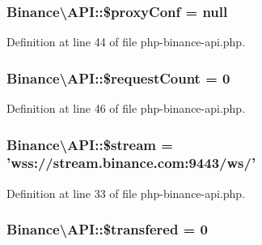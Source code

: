 \hypertarget{classBinance_1_1API_a1415587257942c2b5af22c642ff58005}{
\subsubsection[{\$proxy\-Conf}]{\setlength{\rightskip}{0pt plus 5cm}Binance\textbackslash{}\-A\-P\-I\-::\$proxy\-Conf = null\hspace{0.3cm}{\ttfamily [protected]}}}\label{classBinance_1_1API_a1415587257942c2b5af22c642ff58005}


Definition at line 44 of file php-\/binance-\/api.\-php.

\hypertarget{classBinance_1_1API_a69a4bfc5a6773dff1d01166dfbb402a2}{
\subsubsection[{\$request\-Count}]{\setlength{\rightskip}{0pt plus 5cm}Binance\textbackslash{}\-A\-P\-I\-::\$request\-Count = 0\hspace{0.3cm}{\ttfamily [protected]}}}\label{classBinance_1_1API_a69a4bfc5a6773dff1d01166dfbb402a2}


Definition at line 46 of file php-\/binance-\/api.\-php.

\hypertarget{classBinance_1_1API_a0ce2df2282110071b78061c3043200af}{
\subsubsection[{\$stream}]{\setlength{\rightskip}{0pt plus 5cm}Binance\textbackslash{}\-A\-P\-I\-::\$stream = 'wss\-://stream.\-binance.\-com\-:9443/ws/'\hspace{0.3cm}{\ttfamily [protected]}}}\label{classBinance_1_1API_a0ce2df2282110071b78061c3043200af}


Definition at line 33 of file php-\/binance-\/api.\-php.

\hypertarget{classBinance_1_1API_ac40776b871ae1591348c96162e872789}{
\subsubsection[{\$transfered}]{\setlength{\rightskip}{0pt plus 5cm}Binance\textbackslash{}\-A\-P\-I\-::\$transfered = 0\hspace{0.3cm}{\ttfamily [protected]}}}\label{classBinance_1_1API_ac40776b871ae1591348c96162e872789}



